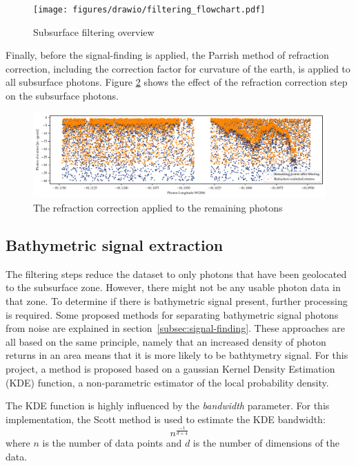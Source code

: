 \begin{figure}[htb]
    \centering
    \texttt{[image: figures/drawio/filtering\_flowchart.pdf]}
    \caption{Subsurface filtering overview}
    \label{fig:filtering-flowchart}
\end{figure}

Finally, before the signal-finding is applied, the Parrish method of refraction correction, including the correction factor for curvature of the earth, is applied to all subsurface photons. Figure \ref{fig:refraction-photons} shows the effect of the refraction correction step on the subsurface photons.

\begin{figure}[htb]
    \centering
    \includegraphics[width=\textwidth]{figures/methodology_refraction.pdf}
    \caption{The refraction correction applied to the remaining photons}
    \label{fig:refraction-photons}
\end{figure}

\subsection{Bathymetric signal extraction}\label{subsec:kdesignalfinding}

The filtering steps reduce the dataset to only photons that have been geolocated to the subsurface zone. However, there might not be any usable photon data in that zone. To determine if there is bathymetric signal present, further processing is required. Some proposed methods for separating bathymetric signal photons from noise are explained in section~\ref{subsec:signal-finding}. These approaches are all based on the same principle, namely that an increased density of photon returns in an area means that it is more likely to be bathtymetry signal. For this project, a method is proposed based on a gaussian Kernel Density Estimation (KDE) function, a non-parametric estimator of the local probability density. 

The KDE function is highly influenced by the \emph{bandwidth} parameter. For this implementation, the Scott method \parencite{Scott2015} is used to estimate the KDE bandwidth: $$ n^{\frac{-1}{d+4}} $$ where $n$ is the number of data points and $d$ is the number of dimensions of the data. 

